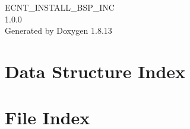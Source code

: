 \documentclass[twoside]{book}
\newcommand{\+}{\discretionary{\mbox{\scriptsize$\hookleftarrow$}}{}{}}
\newcommand{\clearemptydoublepage}{%
  \newpage{\pagestyle{empty}\cleardoublepage}%
}
\begin{document}
\hypersetup{pageanchor=false,
             bookmarksnumbered=true,
             pdfencoding=unicode
            }
\begin{titlepage}
\vspace*{7cm}
\begin{center}%
{\Large E\+C\+N\+T\+\_\+\+I\+N\+S\+T\+A\+L\+L\+\_\+\+B\+S\+P\+\_\+\+I\+NC \\[1ex]\large 1.\+0.\+0 }\\
\vspace*{1cm}
{\large Generated by Doxygen 1.8.13}\\
\end{center}
\end{titlepage}
\clearemptydoublepage
{}
\tableofcontents
\clearemptydoublepage
{}
\hypersetup{pageanchor=true}

\chapter{Data Structure Index}

\chapter{File Index}

\end{document}
